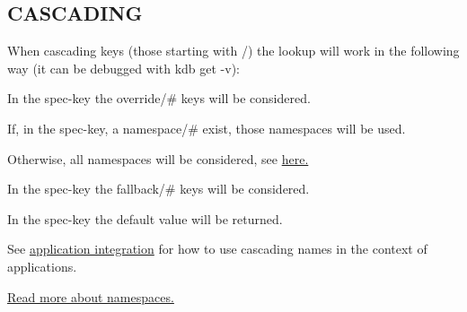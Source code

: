 \subsection*{C\+A\+S\+C\+A\+D\+I\+NG}

When cascading keys (those starting with {\ttfamily /}) the lookup will work in the following way (it can be debugged with {\ttfamily kdb get -\/v})\+:


\begin{DoxyEnumerate}
\item In the {\ttfamily spec}-\/key the {\ttfamily override/\#} keys will be considered.
\item If, in the {\ttfamily spec}-\/key, a {\ttfamily namespace/\#} exist, those namespaces will be used.
\item Otherwise, all namespaces will be considered, see \hyperlink{doc_help_elektra-namespaces_md}{here.}
\item In the {\ttfamily spec}-\/key the {\ttfamily fallback/\#} keys will be considered.
\item In the {\ttfamily spec}-\/key the {\ttfamily default} value will be returned.
\end{DoxyEnumerate}

See \hyperlink{doc_tutorials_application-integration_md}{application integration} for how to use cascading names in the context of applications.

\hyperlink{doc_help_elektra-namespaces_md}{Read more about namespaces.} 